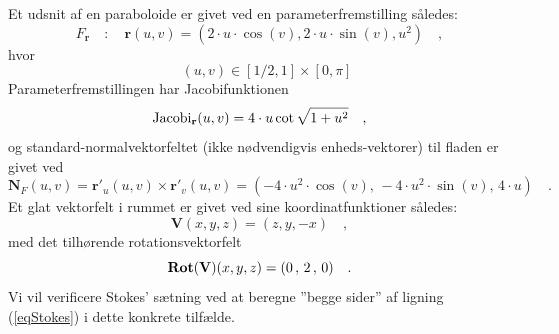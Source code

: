 




\begin{example} \label{exampDiskStokes}
Et udsnit af en paraboloide er givet ved en parameterfremstilling således:
\begin{equation}
F_{\mathbf{r}}\quad : \quad \mathbf{r}(u,v) = (2\cdot u \cdot \cos(v), 2\cdot u \cdot \sin(v), u^{2} ) \quad ,
\end{equation}
hvor
\begin{equation}
\quad (u,v) \in [1/2, 1] \times [0, \pi]
\end{equation}
Parameterfremstillingen har  Jacobifunktionen
\begin{equation}
\operatorname{Jacobi}_{\mathbf{r}}(u,v) = 4\cdot u \cot \sqrt{1 + u^{2}} \quad ,
\end{equation}
og standard-normalvektorfeltet (ikke nødvendigvis enheds-vektorer)  til fladen er givet ved
\begin{equation}
\mathbf{N}_{F}(u,v) = \mathbf{r}'_{u}(u,v) \times \mathbf{r}'_{v}(u,v) = (-4\cdot u^{2}\cdot \cos(v), \, -4\cdot u^{2}\cdot \sin(v), \,4\cdot u) \quad .
\end{equation}
Et glat vektorfelt i rummet er givet ved sine koordinatfunktioner således:
\begin{equation}
\mathbf{V}(x,y,z) = (z, y, -x) \quad ,
\end{equation}
med det tilhørende rotationsvektorfelt
\begin{equation}
\operatorname{\mathbf{Rot}}(\mathbf{V})(x,y,z) = (0\, , \, 2 \, , \, 0) \quad .
\end{equation}
Vi vil verificere Stokes' sætning ved at beregne ''begge sider'' af ligning (\ref{eqStokes}) i dette konkrete tilfælde.\\


\end{example}
